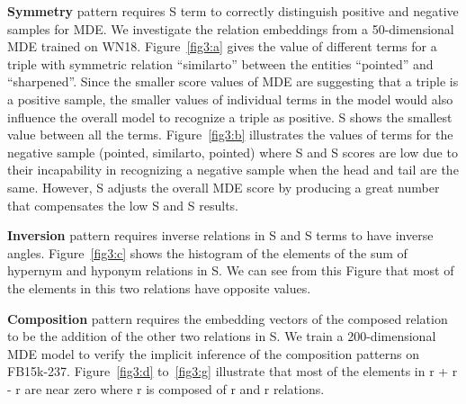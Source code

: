 \documentclass{ecai}
\begin{document}
\textbf{Symmetry} pattern requires S term to correctly distinguish positive and negative samples for MDE. We investigate the relation embeddings from a 50-dimensional MDE trained on WN18. Figure~\ref{fig3:a} gives the value of different terms for a triple with symmetric relation ``similarto'' between the entities ``pointed'' and ``sharpened''. Since the smaller score values of MDE are suggesting that a triple is a positive sample, the smaller values of individual terms in the model would also influence the overall model to recognize a triple as positive. S shows the smallest value between all the terms.
Figure~\ref{fig3:b} illustrates the values of terms for the negative sample (pointed, similarto, pointed) where S and S scores are low due to their incapability in recognizing a negative sample when the head and tail are the same. However, S adjusts the overall MDE score by producing a great number that compensates the low S and S results.

\textbf{Inversion} pattern requires inverse relations in S and S terms to have inverse angles. Figure~\ref{fig3:c} shows the histogram of the elements of the sum of hypernym and hyponym relations in S. We can see from this Figure that most of the elements in this two relations have opposite values.

\textbf{Composition} pattern requires the embedding vectors of the composed relation to be the addition of the other two relations in S. We train a 200-dimensional MDE model to verify the implicit inference of the composition patterns on FB15k-237. Figure~\ref{fig3:d} to~\ref{fig3:g} illustrate that most of the elements in  r + r - r are near zero where r is composed of r and r relations.
\end{document}
